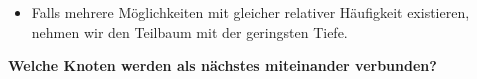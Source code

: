 \begin{itemize}
\begin{figure}[H]
		      \caption{Erster Schritt im Huffman-Kodierungs-Algorithmus}
	      \end{figure}
	\item Falls mehrere Möglichkeiten mit gleicher relativer Häufigkeit existieren, nehmen wir den Teilbaum mit der geringsten Tiefe.
\end{itemize}
\textbf{Welche Knoten werden als nächstes miteinander verbunden?}

